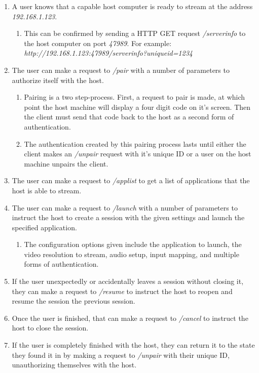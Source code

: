 \begin{enumerate}
  \item A user knows that a capable host computer is ready to stream at the address \emph{192.168.1.123}.
        \begin{enumerate}
          \item This can be confirmed by sending a HTTP GET request \emph{/serverinfo} to the host computer on port \emph{47989}. For example: \newline\emph{http://192.168.1.123:47989/serverinfo?uniqueid=1234}
        \end{enumerate}
  \item The user can make a request to \emph{/pair} with a number of parameters to authorize itself with the host.
        \begin{enumerate}
          \item Pairing is a two step-process.
                First, a request to pair is made, at which point the host machine will display a four digit code on it's screen.
                Then the client must send that code back to the host as a second form of authentication.
          \item The authentication created by this pairing process lasts until either the client makes an \emph{/unpair} request with it's unique ID or a user on the host machine unpairs the client.
        \end{enumerate}
  \item The user can make a request to \emph{/applist} to get a list of applications that the host is able to stream.
  \item The user can make a request to \emph{/launch} with a number of parameters to instruct the host to create a session with the given settings and launch the specified application.
        \begin{enumerate}
          \item The configuration options given include the application to launch, the video resolution to stream, audio setup, input mapping, and multiple forms of authentication.
        \end{enumerate}
  \item If the user unexpectedly or accidentally leaves a session without closing it, they can make a request to \emph{/resume} to instruct the host to reopen and resume the session the previous session.
  \item Once the user is finished, that can make a request to \emph{/cancel} to instruct the host to close the session.
  \item If the user is completely finished with the host, they can return it to the state they found it in by making a request to \emph{/unpair} with their unique ID, unauthorizing themselves with the host.
\end{enumerate}

